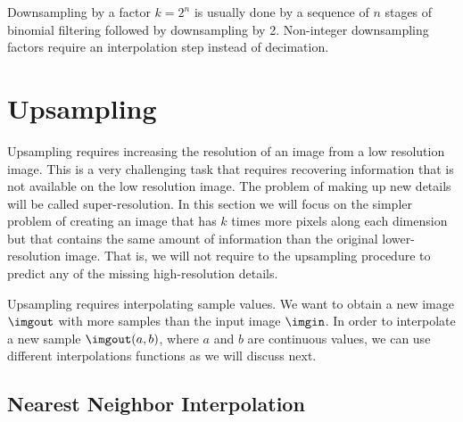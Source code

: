 Downsampling by a factor $k=2^n$ is usually done by a sequence of $n$ stages of binomial filtering followed by downsampling by 2. Non-integer downsampling factors require an interpolation step instead of decimation.

\section{Upsampling}
\label{sec:upsampling}


Upsampling requires increasing the resolution of an image from a low resolution image. This is a very challenging task that requires recovering information that is not available on the low resolution image. The problem of making up new details will be called super-resolution.  In this section we will focus on the simpler problem of creating an image that has $k$ times more pixels along each dimension but that contains the same amount of information than the original lower-resolution image. That is, we will not require to the upsampling procedure to predict any of the missing high-resolution details.

Upsampling requires interpolating sample values. We want to obtain a new image $\imgout$ with more samples than the input image $\imgin$. In order to interpolate a new sample $\imgout(a,b)$, where $a$ and $b$ are continuous values, we can use different interpolations functions as we will discuss next.

\subsection{Nearest Neighbor Interpolation}
\label{sec:interpolation}


